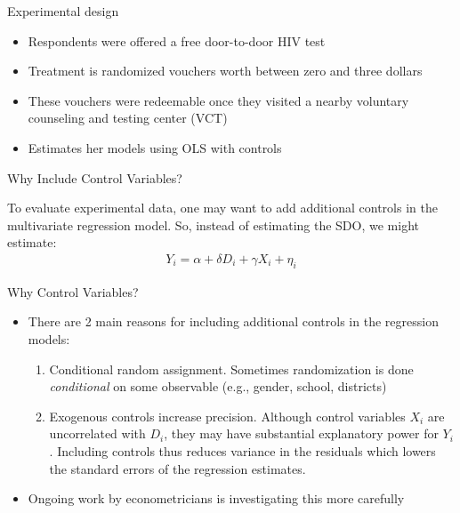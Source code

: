 \documentclass{beamer}
\begin{document}
\begin{frame}{Experimental design}

  \begin{itemize}
    \item Respondents were offered a free door-to-door HIV test
    \item Treatment is randomized vouchers worth between zero and three dollars
    \item These vouchers were redeemable once they visited a nearby voluntary counseling and testing center (VCT)
    \item Estimates her models using OLS with controls
  \end{itemize}

\end{frame}


\begin{frame}{Why Include Control Variables?}

  To evaluate experimental data, one may want to add additional controls in the multivariate regression model.  So, instead of estimating the SDO, we might estimate:
  \begin{eqnarray*}
    Y_i = \alpha + \delta D_i + \gamma X_i + \eta_i
  \end{eqnarray*}
\end{frame}


\begin{frame}{Why Control Variables?}
  \begin{itemize}
    \item There are 2 main reasons for including additional controls in the regression models:
          \begin{enumerate}
            \item Conditional random assignment.  Sometimes randomization is done \emph{conditional} on some observable (e.g., gender, school, districts)
            \item Exogenous controls increase precision.  Although control variables $X_i$ are uncorrelated with $D_i$, they may have substantial explanatory power for $Y_i$. Including controls thus reduces variance in the residuals which lowers the standard errors of the regression estimates.
          \end{enumerate}
    \item Ongoing work by econometricians is investigating this more carefully
  \end{itemize}
\end{frame}
\end{document}
